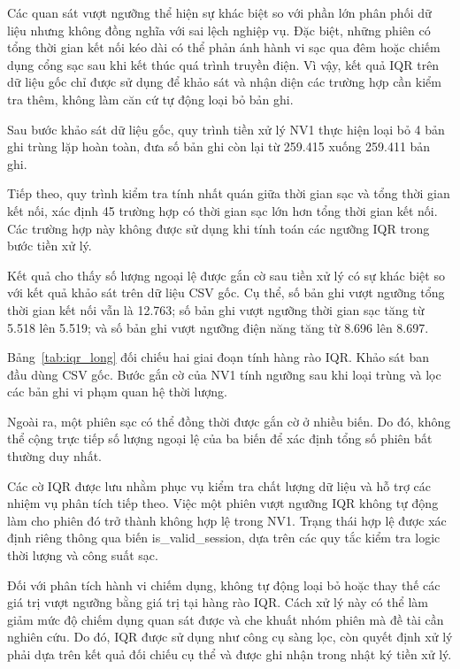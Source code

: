 \documentclass[conference,a4paper]{IEEEtran}
\begin{document}
Các quan sát vượt ngưỡng thể hiện sự khác biệt so với phần lớn phân phối dữ liệu nhưng không đồng nghĩa với sai lệch nghiệp vụ. Đặc biệt, những phiên có tổng thời gian kết nối kéo dài có thể phản ánh hành vi sạc qua đêm hoặc chiếm dụng cổng sạc sau khi kết thúc quá trình truyền điện. Vì vậy, kết quả IQR trên dữ liệu gốc chỉ được sử dụng để khảo sát và nhận diện các trường hợp cần kiểm tra thêm, không làm căn cứ tự động loại bỏ bản ghi.

Sau bước khảo sát dữ liệu gốc, quy trình tiền xử lý NV1 thực hiện loại bỏ 4 bản ghi trùng lặp hoàn toàn, đưa số bản ghi còn lại từ 259.415 xuống 259.411 bản ghi.

Tiếp theo, quy trình kiểm tra tính nhất quán giữa thời gian sạc và tổng thời gian kết nối, xác định 45 trường hợp có thời gian sạc lớn hơn tổng thời gian kết nối. Các trường hợp này không được sử dụng khi tính toán các ngưỡng IQR trong bước tiền xử lý.

Kết quả cho thấy số lượng ngoại lệ được gắn cờ sau tiền xử lý có sự khác biệt so với kết quả khảo sát trên dữ liệu CSV gốc. Cụ thể, số bản ghi vượt ngưỡng tổng thời gian kết nối vẫn là 12.763; số bản ghi vượt ngưỡng thời gian sạc tăng từ 5.518 lên 5.519; và số bản ghi vượt ngưỡng điện năng tăng từ 8.696 lên 8.697.

Bảng~\ref{tab:iqr_long} đối chiếu hai giai đoạn tính hàng rào IQR. Khảo sát ban đầu dùng CSV gốc. Bước gắn cờ của NV1 tính ngưỡng sau khi loại trùng và lọc các bản ghi vi phạm quan hệ thời lượng.

Ngoài ra, một phiên sạc có thể đồng thời được gắn cờ ở nhiều biến. Do đó, không thể cộng trực tiếp số lượng ngoại lệ của ba biến để xác định tổng số phiên bất thường duy nhất.

Các cờ IQR được lưu nhằm phục vụ kiểm tra chất lượng dữ liệu và hỗ trợ các nhiệm vụ phân tích tiếp theo. Việc một phiên vượt ngưỡng IQR không tự động làm cho phiên đó trở thành không hợp lệ trong NV1. Trạng thái hợp lệ được xác định riêng thông qua biến is\_valid\_session, dựa trên các quy tắc kiểm tra logic thời lượng và công suất sạc.

Đối với phân tích hành vi chiếm dụng, không tự động loại bỏ hoặc thay thế các giá trị vượt ngưỡng bằng giá trị tại hàng rào IQR. Cách xử lý này có thể làm giảm mức độ chiếm dụng quan sát được và che khuất nhóm phiên mà đề tài cần nghiên cứu. Do đó, IQR được sử dụng như công cụ sàng lọc, còn quyết định xử lý phải dựa trên kết quả đối chiếu cụ thể và được ghi nhận trong nhật ký tiền xử lý.
\end{document}
